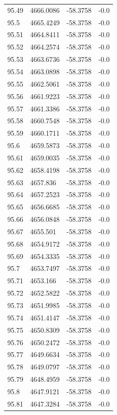 \begin{table}[H]
\begin{tabular}{llll}
95.49 & 4666.0086 & -58.3758 & -0.0 \\
95.5 & 4665.4249 & -58.3758 & -0.0 \\
95.51 & 4664.8411 & -58.3758 & -0.0 \\
95.52 & 4664.2574 & -58.3758 & -0.0 \\
95.53 & 4663.6736 & -58.3758 & -0.0 \\
95.54 & 4663.0898 & -58.3758 & -0.0 \\
95.55 & 4662.5061 & -58.3758 & -0.0 \\
95.56 & 4661.9223 & -58.3758 & -0.0 \\
95.57 & 4661.3386 & -58.3758 & -0.0 \\
95.58 & 4660.7548 & -58.3758 & -0.0 \\
95.59 & 4660.1711 & -58.3758 & -0.0 \\
95.6 & 4659.5873 & -58.3758 & -0.0 \\
95.61 & 4659.0035 & -58.3758 & -0.0 \\
95.62 & 4658.4198 & -58.3758 & -0.0 \\
95.63 & 4657.836 & -58.3758 & -0.0 \\
95.64 & 4657.2523 & -58.3758 & -0.0 \\
95.65 & 4656.6685 & -58.3758 & -0.0 \\
95.66 & 4656.0848 & -58.3758 & -0.0 \\
95.67 & 4655.501 & -58.3758 & -0.0 \\
95.68 & 4654.9172 & -58.3758 & -0.0 \\
95.69 & 4654.3335 & -58.3758 & -0.0 \\
95.7 & 4653.7497 & -58.3758 & -0.0 \\
95.71 & 4653.166 & -58.3758 & -0.0 \\
95.72 & 4652.5822 & -58.3758 & -0.0 \\
95.73 & 4651.9985 & -58.3758 & -0.0 \\
95.74 & 4651.4147 & -58.3758 & -0.0 \\
95.75 & 4650.8309 & -58.3758 & -0.0 \\
95.76 & 4650.2472 & -58.3758 & -0.0 \\
95.77 & 4649.6634 & -58.3758 & -0.0 \\
95.78 & 4649.0797 & -58.3758 & -0.0 \\
95.79 & 4648.4959 & -58.3758 & -0.0 \\
95.8 & 4647.9121 & -58.3758 & -0.0 \\
95.81 & 4647.3284 & -58.3758 & -0.0 \\

\end{tabular}
\end{table}

